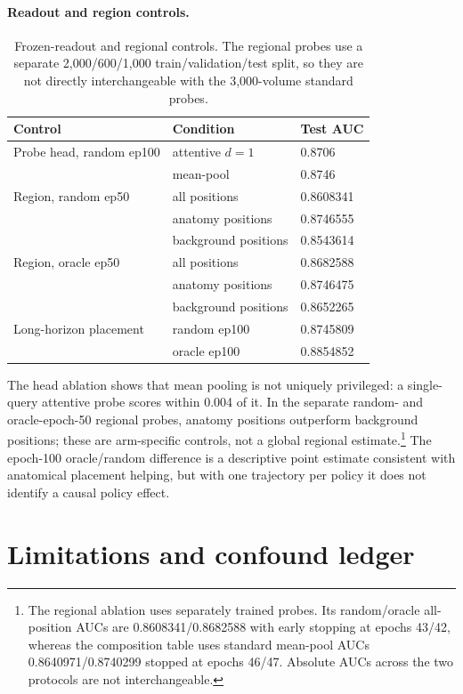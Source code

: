 \documentclass{article}
\begin{document}
\paragraph{Readout and region controls.}
\begin{table}[t]
\centering
\small
\setlength{\tabcolsep}{4pt}
\caption{Frozen-readout and regional controls. The regional probes use a
separate 2,000/600/1,000 train/validation/test split, so they are not directly
interchangeable with the
3,000-volume standard probes.}
\label{tab:ablations}
\begin{tabular}{lll}
\toprule
Control & Condition & Test AUC \\
\midrule
Probe head, random ep100 & attentive $d=1$ & 0.8706 \\
 & mean-pool & 0.8746 \\
\midrule
Region, random ep50 & all positions & 0.8608341 \\
 & anatomy positions & 0.8746555 \\
 & background positions & 0.8543614 \\
Region, oracle ep50 & all positions & 0.8682588 \\
 & anatomy positions & 0.8746475 \\
 & background positions & 0.8652265 \\
\midrule
Long-horizon placement & random ep100 & 0.8745809 \\
 & oracle ep100 & 0.8854852 \\
\bottomrule
\end{tabular}
\end{table}

The head ablation shows that mean pooling is not uniquely privileged: a
single-query attentive probe scores within 0.004 of it. In the separate random- and
oracle-epoch-50 regional probes, anatomy positions outperform background
positions; these are arm-specific controls, not a global regional
estimate.\footnote{The regional ablation uses separately trained probes. Its
random/oracle all-position AUCs are 0.8608341/0.8682588 with early stopping at
epochs 43/42, whereas the composition table uses standard mean-pool AUCs
0.8640971/0.8740299 stopped at epochs 46/47. Absolute AUCs across the two
protocols are not interchangeable.} The epoch-100 oracle/random difference is a
descriptive point estimate consistent with anatomical placement helping, but
with one trajectory per policy it does not identify a causal policy effect.

\section{Limitations and confound ledger}
\end{document}
